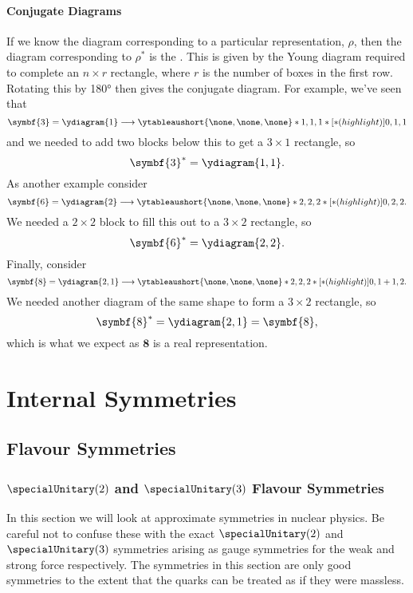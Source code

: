 \documentclass[fleqn]{NotesClass}
\newcommand{\rep}[1]{\symbf{#1}}
\begin{document}
    \subsection{Conjugate Diagrams}
    If we know the diagram corresponding to a particular representation, \(\rho\), then the diagram corresponding to \(\rho^*\) is the .
    This is given by the Young diagram required to complete an \(n \times r\) rectangle, where \(r\) is the number of boxes in the first row.
    Rotating this by \ang{180} then gives the conjugate diagram.
    For example, we've seen that
    \begin{equation}
        \rep{3} = \ydiagram{1} \longrightarrow \ytableaushort{\none,\none,\none}*{1,1,1}*[*(highlight)]{0,1,1}
    \end{equation}
    and we needed to add two blocks below this to get a \(3 \times 1\) rectangle, so
    \begin{equation}
        \rep{3}^* = \ydiagram{1,1}.
    \end{equation}
    As another example consider
    \begin{equation}
        \rep{6} = \ydiagram{2} \longrightarrow \ytableaushort{\none,\none,\none}*{2,2,2}*[*(highlight)]{0,2,2}.
    \end{equation}
    We needed a \(2 \times 2\) block to fill this out to a \(3 \times 2\) rectangle, so
    \begin{equation}
        \rep{6}^* = \ydiagram{2,2}.
    \end{equation}
    Finally, consider
    \begin{equation}
        \rep{8} = \ydiagram{2,1} \longrightarrow \ytableaushort{\none,\none,\none}*{2,2,2}*[*(highlight)]{0,1+1,2}.
    \end{equation}
    We needed another diagram of the same shape to form a \(3\times 2\) rectangle, so
    \begin{equation}
        \rep{8}^* = \ydiagram{2,1} = \rep{8},
    \end{equation}
    which is what we expect as \(\rep{8}\) is a real representation.
    
    \part{Internal Symmetries}
    \chapter{Flavour Symmetries}
    \section{\texorpdfstring{\(\specialUnitary(2)\)}{SU(2)} and \texorpdfstring{\(\specialUnitary(3)\)}{SU(3)} Flavour Symmetries}
    In this section we will look at approximate symmetries in nuclear physics.
    Be careful not to confuse these with the exact \(\specialUnitary(2)\) and \(\specialUnitary(3)\) symmetries arising as gauge symmetries for the weak and strong force respectively.
    The symmetries in this section are only good symmetries to the extent that the quarks can be treated as if they were massless.
    
\end{document}
